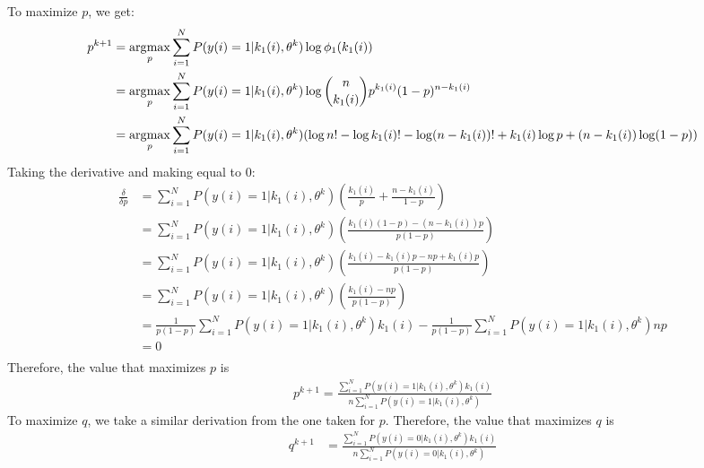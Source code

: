 To maximize $p$, we get:
\begin{align*}
p^{k+1} &= \operatorname*{\arg\!\max}_p \sum_{i=1}^{N}  P(y(i) = 1 | k_1(i), \theta^{k}) \log \phi_1(k_1(i)) \\
&= \operatorname*{\arg\!\max}_p \sum_{i=1}^{N}  P(y(i) = 1 | k_1(i), \theta^{k}) \log \binom{n}{k_1(i)} p^{k_1(i)} (1-p)^{n-k_1(i)}  \\
&= \operatorname*{\arg\!\max}_p \sum_{i=1}^{N}  P(y(i) = 1 | k_1(i), \theta^{k}) (\log n! - \log k_1(i)! - \log (n-k_1(i))! + k_1(i) \log p + (n-k_1(i)) \log (1-p))
\end{align*}
Taking the derivative and making equal to 0:
\begin{align*}
\frac{\delta}{\delta p} &= \sum_{i=1}^{N}  P(y(i) = 1 | k_1(i), \theta^{k}) \left( \frac{k_1(i)}{p} + \frac{n-k_1(i)}{1-p} \right) \\
&= \sum_{i=1}^{N}  P(y(i) = 1 | k_1(i), \theta^{k}) \left( \frac{k_1(i)(1-p) - (n-k_1(i))p}{p(1-p)}
\right) \\
&= \sum_{i=1}^{N}  P(y(i) = 1 | k_1(i), \theta^{k}) \left( \frac{k_1(i)- k_1(i)p - np +k_1(i)p}{p(1-p)} \right) \\
&= \sum_{i=1}^{N}  P(y(i) = 1 | k_1(i), \theta^{k}) \left( \frac{k_1(i)- np}{p(1-p)} \right) \\
&= \frac{1}{p(1-p)} \sum_{i=1}^{N} P(y(i) = 1 | k_1(i), \theta^{k}) k_1(i) - \frac{1}{p(1-p)} \sum_{i=1}^{N} P(y(i) = 1 | k_1(i), \theta^{k}) np \\
&= 0 \\
\end{align*}
Therefore, the value that maximizes $p$ is
\begin{align*}
p^{k+1} = \frac{\sum_{i=1}^{N} P(y(i) = 1 | k_1(i), \theta^{k}) k_1(i)}{n \sum_{i=1}^{N} P(y(i) = 1 | k_1(i), \theta^{k})}
\end{align*}
To maximize $q$, we take a similar derivation from the one taken for $p$. Therefore, the value that maximizes $q$ is
\begin{align*}
q^{k+1} &= \frac{\sum_{i=1}^{N} P(y(i) = 0 | k_1(i), \theta^{k}) k_1(i)}{n \sum_{i=1}^{N} P(y(i) = 0 | k_1(i), \theta^{k})}
\end{align*}






